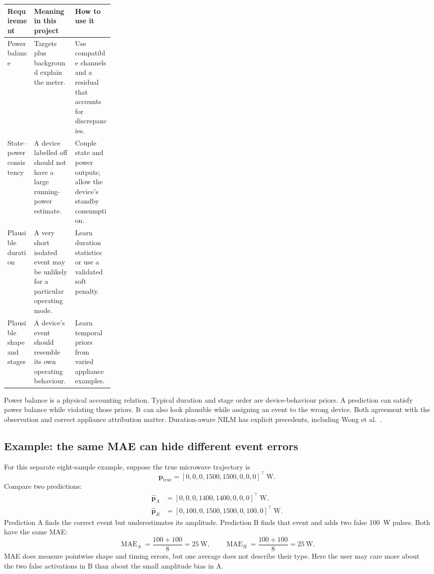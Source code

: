 \documentclass[11pt]{article}
\newcommand{\vect}[1]{\mathbf{#1}}
\begin{document}
\begin{center}
\small
\begin{tabularx}{\linewidth}{@{}p{0.25\linewidth}YY@{}}
\toprule
Requirement & Meaning in this project & How to use it \\
\midrule
Power balance & Targets plus background explain the meter. & Use compatible channels and a residual that accounts for discrepancies. \\
State--power consistency & A device labelled off should not have a large running-power estimate. & Couple state and power outputs; allow the device's standby consumption. \\
Plausible duration & A very short isolated event may be unlikely for a particular operating mode. & Learn duration statistics or use a validated soft penalty. \\
Plausible shape and stages & A device's event should resemble its own operating behaviour. & Learn temporal priors from varied appliance examples. \\
\bottomrule
\end{tabularx}
\end{center}

Power balance is a physical accounting relation. Typical duration and stage order are device-behaviour priors. A prediction can satisfy power balance while violating those priors. It can also look plausible while assigning an event to the wrong device. Both agreement with the observation and correct appliance attribution matter. Duration-aware NILM has explicit precedents, including Wong et al.~\cite{wong2014}.

\subsection{Example: the same MAE can hide different event errors}

For this separate eight-sample example, suppose the true microwave trajectory is
\[
    \vect{p}_{\mathrm{true}}=[0,0,0,1500,1500,0,0,0]^{\top}\ \mathrm{W}.
\]
Compare two predictions:
\begin{align*}
    \hat{\vect{p}}_{A}&=[0,0,0,1400,1400,0,0,0]^{\top}\ \mathrm{W},\\
    \hat{\vect{p}}_{B}&=[0,100,0,1500,1500,0,100,0]^{\top}\ \mathrm{W}.
\end{align*}
Prediction A finds the correct event but underestimates its amplitude. Prediction B finds that event and adds two false 100~W pulses. Both have the same MAE:
\[
    \operatorname{MAE}_A=\frac{100+100}{8}=25\ \mathrm{W},
    \qquad
    \operatorname{MAE}_B=\frac{100+100}{8}=25\ \mathrm{W}.
\]
MAE does measure pointwise shape and timing errors, but one average does not describe their type. Here the user may care more about the two false activations in B than about the small amplitude bias in A.
\end{document}
